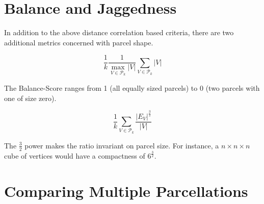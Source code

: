 \section{Balance and Jaggedness}

In addition to the above distance correlation based criteria, there are
two additional metrics concerned with parcel shape.

\begin{definition}[Balance] \label{balance}
\[ \frac{1}{k} \frac{1}{\max_{V \in \mathcal{P}_k} |V|}
   \sum_{V \in \mathcal{P}_k} |V| \]
\end{definition}

The Balance-Score ranges from 1 (all equally sized parcels) to
0 (two parcels with one of size zero).

\begin{definition}[Jaggedness] \label{jaggedness}
\[ \frac{1}{k} \sum_{V \in \mathcal{P}_k} \frac{|E_V|^\frac{3}{2}}{|V|}
\]
\end{definition}

The $\frac{3}{2}$ power makes the ratio invariant on parcel size.
For instance, a $n \times n \times n$ cube of vertices would have
a compactness of $6^{\frac{3}{2}}$.

\section{Comparing Multiple Parcellations}
